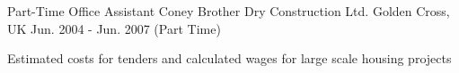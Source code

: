 \begin{cventries}
  \cventry
    {Part-Time Office Assistant} %
    {Coney Brother Dry Construction Ltd.} %
    {Golden Cross, UK} %
    {Jun. 2004 - Jun. 2007 (Part Time)} %
    {
      \begin{cvitems} %
        \item {Estimated costs for tenders and calculated wages for large scale housing projects}
      \end{cvitems}
    }  
     
\end{cventries}
